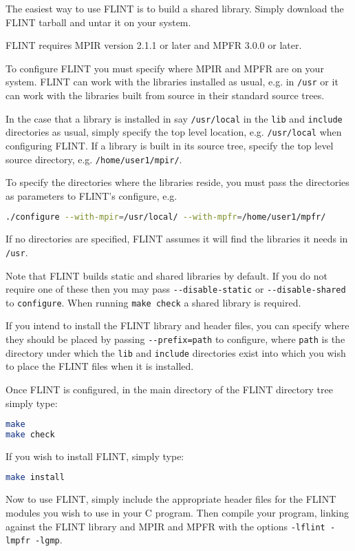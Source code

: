 \documentclass[a4paper,10pt]{book}
\newcommand{\code}{\lstinline}
\begin{document}
The easiest way to use FLINT is to build a shared library.  Simply download 
the FLINT tarball and untar it on your system.

FLINT requires MPIR version 2.1.1 or later and MPFR 3.0.0 or later.

To configure FLINT you must specify where MPIR and MPFR are on
your system. FLINT can work with the libraries installed as usual,
e.g. in \code{/usr} or it can work with the libraries built
from source in their standard source trees. 

In the case that a library is installed in say \code{/usr/local}
in the \code{lib} and \code{include} directories as usual, simply
specify the top level location, e.g. \code{/usr/local} when 
configuring FLINT. If a library is built in its source tree,
specify the top level source directory, e.g. \code{/home/user1/mpir/}.

To specify the directories where the libraries reside, you must
pass the directories as parameters to FLINT's configure, e.g.\ 
\begin{lstlisting}[language=bash]
./configure --with-mpir=/usr/local/ --with-mpfr=/home/user1/mpfr/
\end{lstlisting}
If no directories are specified, FLINT assumes it will find the
libraries it needs in \code{/usr}.

Note that FLINT builds static and shared libraries by default. If
you do not require one of these then you may pass 
\code{--disable-static} or \code{--disable-shared} to 
\code{configure}. When running \code{make check} a shared library
is required.

If you intend to install the FLINT library and header files, 
you can specify where they should be placed by passing 
\code{--prefix=path} to configure, where \code{path} is the directory
under which the \code{lib} and \code{include} directories exist into
which you wish to place the FLINT files when it is installed.

Once FLINT is configured, in the main directory of the FLINT directory 
tree simply type:
\begin{lstlisting}[language=bash]
make
make check
\end{lstlisting}

If you wish to install FLINT, simply type:
\begin{lstlisting}[language=bash]
make install
\end{lstlisting}

Now to use FLINT, simply include the appropriate header files for 
the FLINT modules you wish to use in your C program.  Then compile 
your program, linking against the FLINT library and MPIR and MPFR 
with the options \code{-lflint -lmpfr -lgmp}.
\end{document}
